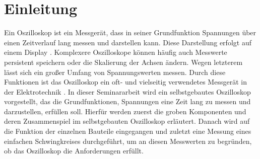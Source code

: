 \section{Einleitung}

Ein Oszilloskop ist ein Messgerät, dass in seiner Grundfunktion Spannungen
über einen Zeitverlauf lang messen und darstellen kann. \newline
Diese Darstellung erfolgt auf einem Display \cite{KnowUrOscilloscope}. \newline
Komplexere Oszilloskope können häufig auch Messwerte persistent speichern oder die Skalierung der Achsen
ändern. Wegen letzterem lässt sich ein großer Umfang von Spannungswerten messen.
Durch diese Funktionen ist das Oszilloskop ein oft- und vielseitig verwendetes Messgerät
in der Elektrotechnik \cite{ETechnikEinfach}. \newline \newline
In dieser Seminararbeit wird ein selbstgebautes Oszilloskop vorgestellt, das die Grundfunktionen,
Spannungen eine Zeit lang zu messen und darzustellen, erfüllen soll. \newline
Hierfür werden zuerst die groben Komponenten und deren Zusammenspiel im selbstgebauten Oszilloskop erläutert.
Danach wird auf die Funktion der einzelnen Bauteile eingegangen und
zuletzt eine Messung eines einfachen Schwingkreises durchgeführt, um an diesen Messwerten zu begründen,
ob das Oszilloskop die Anforderungen erfüllt.  